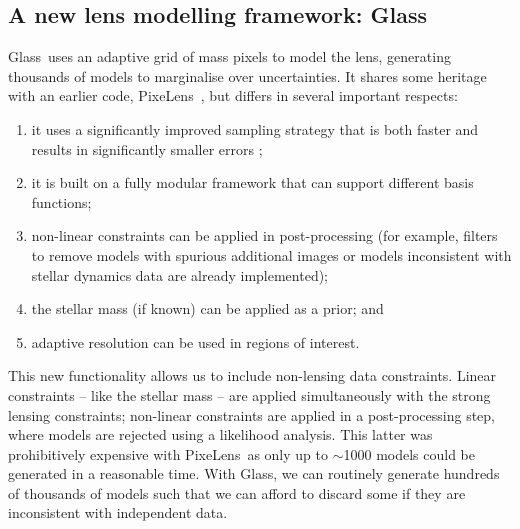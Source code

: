 \documentclass[galley,usenatbib]{mn2e}
\newcommand{\Glass}{{\sc Glass}}
\newcommand{\PixeLens}{{\sc PixeLens}}
\begin{document}
\subsection{A new lens modelling framework: \Glass}

\Glass\ uses an adaptive grid of mass pixels
to model the lens, generating thousands of models to marginalise over
uncertainties. It shares some heritage with an earlier code, \PixeLens\
\citep{1997MNRAS.292..148S,2008ApJ...679...17C}, but differs in several
important respects: 

\begin{enumerate} 
\item it uses a significantly improved sampling strategy that is both faster and results in significantly smaller errors \citep{2012MNRAS.425.3077L};
\item it is built on a fully modular framework that can support different basis functions;
\item non-linear constraints can be applied in post-processing (for example, filters to remove models with spurious additional images or models inconsistent with stellar dynamics data are already implemented);
\item the stellar mass (if known) can be applied as a prior; and
\item adaptive resolution can be used in regions of interest. 
\end{enumerate}

This new functionality allows us to include non-lensing data constraints. Linear constraints -- like the stellar
mass -- are applied simultaneously with the strong lensing constraints;
non-linear constraints are applied in a post-processing step, where models are
rejected using a likelihood analysis. This latter was prohibitively expensive
with \PixeLens\ as only up to $\sim$1000 models could be generated in a
reasonable time. With \Glass, we can routinely generate hundreds of thousands
of models such that we can afford to discard some if they are inconsistent with
independent data.
\end{document}
